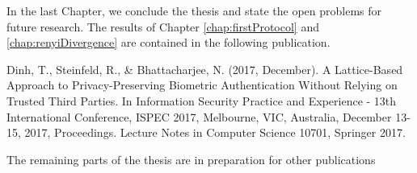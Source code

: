 In the last Chapter, we conclude the thesis and state the open problems for
future research. The results of Chapter \ref{chap:firstProtocol} and
\ref{chap:renyiDivergence} are contained in the following publication. 

Dinh, T., Steinfeld, R., \& Bhattacharjee, N. (2017, December). A Lattice-Based Approach to Privacy-Preserving Biometric Authentication Without Relying on Trusted Third Parties. In Information Security Practice and Experience - 13th International Conference, ISPEC 2017, Melbourne, VIC, Australia, December 13-15, 2017, Proceedings. Lecture Notes in Computer Science 10701, Springer 2017.


The remaining parts of the thesis are in preparation for other publications

